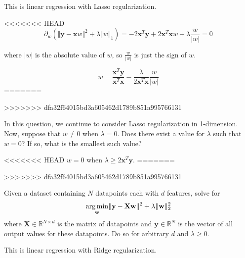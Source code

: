 This is linear regression with Lasso regularization.

\begin{subsolution}
<<<<<<< HEAD
  \begin{equation}
    \partial_w(\Vert\mathbf{y} - \mathbf{x}w\Vert^2 + \lambda\Vert w\Vert_1) = -2\mathbf{x}^T\mathbf{y}+2\mathbf{x}^T\mathbf{x}w+\lambda \frac{w}{|w|}= 0
  \end{equation}

  where $|w|$ is the absolute value of $w$, so $\frac{w}{|w|}$ is just the sign of $w$.

  \begin{equation}
   w = \frac{\mathbf{x}^T\mathbf{y}}{\mathbf{x}^T\mathbf{x}}-\frac{\lambda}{2\mathbf{x}^T\mathbf{x}}\frac{w}{|w|}
 \end{equation}
=======
 
>>>>>>> dfa32f64015bd3a605462d1789b851a995766131
\end{subsolution}

\subproblem
In this question, we continue to consider Lasso regularization in 1-dimension. Now, suppose that $w \neq 0$ when $\lambda = 0$. Does there exist a value for $\lambda$ such that $w = 0$? If so, what is the smallest such value?

\begin{subsolution}
<<<<<<< HEAD
  $w=0$ when $\lambda \ge 2\mathbf{x}^T\mathbf{y}$.
=======
  
>>>>>>> dfa32f64015bd3a605462d1789b851a995766131
\end{subsolution}

\problem[9]
\subproblem
Given a dataset containing $N$ datapoints each with $d$ features, solve for
\[\underset{\mathbf{w}}{\operatorname{arg\,min}} \Vert\mathbf{y} - \mathbf{X}\mathbf{w}\Vert^2 + \lambda\Vert\mathbf{w}\Vert_2^2
\]
where $\mathbf{X} \in \mathbb{R}^{N \times d}$ is the matrix of datapoints and $\mathbf{y} \in \mathbb{R}^N$ is the  vector of all output values for these datapoints. Do so for arbitrary $d$ and $\lambda \geq 0$.

This is linear regression with Ridge regularization.

